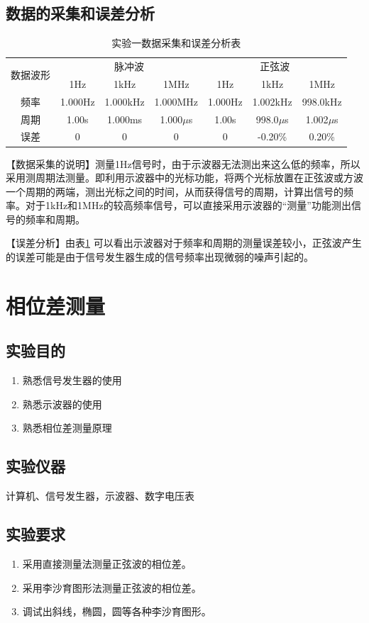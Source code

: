 \documentclass[12pt]{article}
\begin{document}
\subsection{数据的采集和误差分析}
\begin{table}[htbp]
  \centering
  \caption{实验一数据采集和误差分析表}
    \begin{tabular}{|c|c|c|c|c|c|c|}
    \hline
    \multirow{2}[4]{*}{数据波形} & \multicolumn{3}{c|}{脉冲波} & \multicolumn{3}{c|}{正弦波}  \\
\cline{2-7}      & 1Hz & 1kHz & 1MHz & 1Hz & 1kHz & 1MHz \\
    \hline
    频率 & 1.000Hz & 1.000kHz & 1.000MHz & 1.000Hz & 1.002kHz & 998.0kHz  \\
    \hline
    周期 & 1.00s & 1.000ms & 1.000$\mu$s & 1.00s & 998.0$\mu$s & 1.002$\mu$s \\
    \hline
    误差 & 0 & 0 & 0 & 0 & -0.20\% & 0.20\%  \\
    \hline
    \end{tabular}%
  \label{tab:sy1}%
\end{table}%
【数据采集的说明】测量1Hz信号时，由于示波器无法测出来这么低的频率，所以采用测周期法测量。即利用示波器中的光标功能，将两个光标放置在正弦波或方波一个周期的两端，测出光标之间的时间，从而获得信号的周期，计算出信号的频率。对于1kHz和1MHz的较高频率信号，可以直接采用示波器的“测量”功能测出信号的频率和周期。\par
【误差分析】由表\ref{tab:sy1}
可以看出示波器对于频率和周期的测量误差较小，正弦波产生的误差可能是由于信号发生器生成的信号频率出现微弱的噪声引起的。
\newpage
\section{相位差测量}
\setcounter{equation}{0}
\setcounter{table}{0}
\setcounter{figure}{0}
\subsection{实验目的}
\begin{enumerate}
  \item 熟悉信号发生器的使用
\item 熟悉示波器的使用
\item 熟悉相位差测量原理
\end{enumerate}
\subsection{实验仪器}
计算机、信号发生器，示波器、数字电压表
\subsection{实验要求}
\begin{enumerate}
  \item 采用直接测量法测量正弦波的相位差。
\item 采用李沙育图形法测量正弦波的相位差。
\item 调试出斜线，椭圆，圆等各种李沙育图形。
\end{enumerate}
\end{document}
